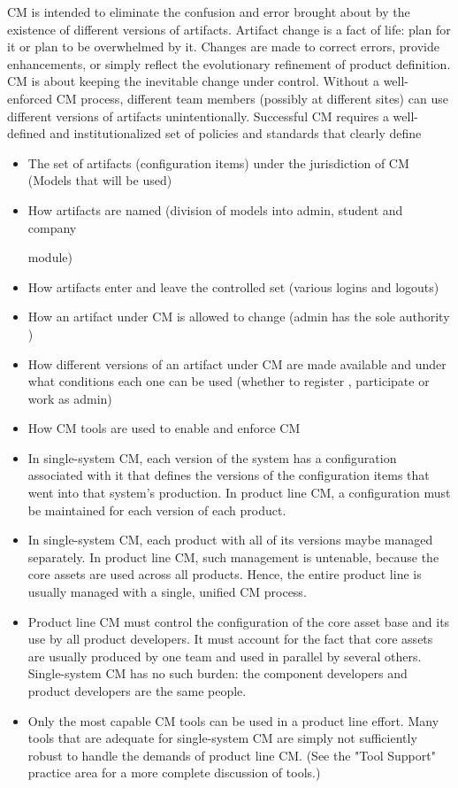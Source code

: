 CM is intended to eliminate the confusion and error brought about by the existence of
different versions of artifacts. Artifact change is a fact of life: plan for it or plan to be overwhelmed by it. Changes are made to correct errors, provide enhancements, or simply reflect the evolutionary refinement of product definition. CM is about keeping the inevitable
change under control. Without a well-enforced CM process, different team members (possibly at different sites) can use different versions of artifacts unintentionally. Successful CM requires a well-defined and institutionalized set of policies and standards that clearly define
\begin{itemize}

\item The set of artifacts (configuration items) under the jurisdiction of CM (Models that
will be used)
\item
How artifacts are named (division of models into admin, student and company

module)
\item How artifacts enter and leave the controlled set (various logins and logouts)
\item How an artifact under CM is allowed to change (admin has the sole authority
)\item
How different versions of an artifact under CM are made available and under what
conditions each one can be used (whether to register , participate or work as admin)
\item
How CM tools are used to enable and enforce CM
\end{itemize}
\begin{itemize}

\item In single-system CM, each version of the system has a configuration associated with it that
defines the versions of the configuration items that went into that system's production. In
product line CM, a configuration must be maintained for each version of each product.
\item In single-system CM, each product with all of its versions maybe managed separately. In product line CM, such management is untenable, because the core assets are used across all products. Hence, the entire product line is usually managed with a single, unified CM process.
\item Product line CM must control the configuration of the core asset base and its use by all product developers. It must account for the fact that core assets are usually produced by one team and used in parallel by several others. Single-system CM has no such burden:
the component developers and product developers are the same people.
\item Only the most capable CM tools can be used in a product line effort. Many tools that are adequate for single-system CM are simply not sufficiently robust to handle the demands of product line CM. (See the "Tool Support" practice area for a more complete discussion of tools.)
\end{itemize}

